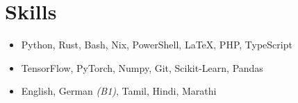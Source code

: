 %

\section*{Skills}
\begin{itemize}
\setlength{\itemsep}{0mm}

\item {}\iftoggle{onepage}{\\}{ }Python, Rust, Bash, Nix, PowerShell, \LaTeX, PHP, TypeScript
\item {}\iftoggle{onepage}{\\}{ }TensorFlow, PyTorch, Numpy, Git, Scikit-Learn, Pandas
\item {}\iftoggle{onepage}{\\}{ }English, German \textit{\textcolor{misc}{(B1)}}, Tamil, Hindi, Marathi

\end{itemize}
